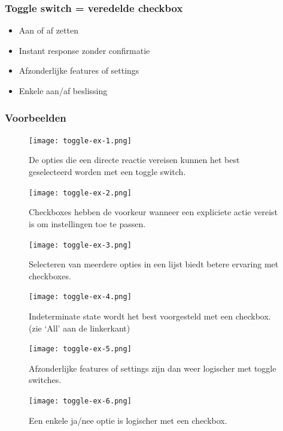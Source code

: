 \documentclass{article}
\begin{document}
\subsubsection{Toggle switch = veredelde checkbox}
\begin{itemize}
    \item Aan of af zetten
    \item Instant response zonder confirmatie
    \item Afzonderlijke features of settings
    \item Enkele aan/af beslissing
\end{itemize}

\subsubsection{Voorbeelden}

\begin{figure}[H]
    \centering
    \texttt{[image: toggle-ex-1.png]}
    \caption{De opties die een directe reactie vereisen kunnen het best geselecteerd worden met een toggle switch.}
\end{figure}

\begin{figure}[H]
    \centering
    \texttt{[image: toggle-ex-2.png]}
    \caption{Checkboxes hebben de voorkeur wanneer een expliciete actie vereist is om instellingen toe te passen.}
\end{figure}

\begin{figure}[H]
    \centering
    \texttt{[image: toggle-ex-3.png]}
    \caption{Selecteren van meerdere opties in een lijst biedt betere ervaring met checkboxes.}
\end{figure}

\begin{figure}[H]
    \centering
    \texttt{[image: toggle-ex-4.png]}
    \caption{Indeterminate state wordt het best voorgesteld met een checkbox. (zie `All' aan de linkerkant)}
\end{figure}

\begin{figure}[H]
    \centering
    \texttt{[image: toggle-ex-5.png]}
    \caption{Afzonderlijke features of settings zijn dan weer logischer met toggle switches.}
\end{figure}

\begin{figure}[H]
    \centering
    \texttt{[image: toggle-ex-6.png]}
    \caption{Een enkele ja/nee optie is logischer met een checkbox.}
\end{figure}
\end{document}
